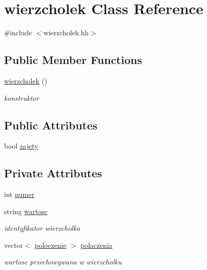 \hypertarget{classwierzcholek}{\section{wierzcholek \-Class \-Reference}
\label{classwierzcholek}
}


{\ttfamily \#include $<$wierzcholek.\-hh$>$}

\subsection*{\-Public \-Member \-Functions}
\begin{DoxyCompactItemize}
\item 
\hyperlink{classwierzcholek_a0e72695b032e7f750c51041e1a59673b}{wierzcholek} ()
\begin{DoxyCompactList}\small\item\em konstruktor \end{DoxyCompactList}\end{DoxyCompactItemize}
\subsection*{\-Public \-Attributes}
\begin{DoxyCompactItemize}
\item 
bool \hyperlink{classwierzcholek_ad67644b5f408397f28d7150d3bac76d2}{zajety}
\end{DoxyCompactItemize}
\subsection*{\-Private \-Attributes}
\begin{DoxyCompactItemize}
\item 
int \hyperlink{classwierzcholek_a66aaea6b1187250f7100542adc1617d2}{numer}
\item 
string \hyperlink{classwierzcholek_a19aa16bf7e01a987fcc360e5da902209}{wartosc}
\begin{DoxyCompactList}\small\item\em identyfikator wierzcholka \end{DoxyCompactList}\item 
vector$<$ \hyperlink{structpoloczenie}{poloczenie} $>$ \hyperlink{classwierzcholek_a34145a2de26c5e95c1ec72b0773005f4}{polaczenia}
\begin{DoxyCompactList}\small\item\em wartosc przechowywana w wierzcholku \end{DoxyCompactList}\end{DoxyCompactItemize}

